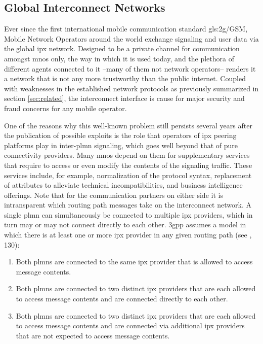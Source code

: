\subsection{Global Interconnect Networks}

Ever since the first international mobile communication standard \gls{gls:2g}/GSM, Mobile Network Operators around the world exchange signaling and user data via the global \gls{ipx} network.
Designed to be a private channel for communication amongst \glspl{mno} only, the way in which it is used today, and the plethora of different agents connected to it --many of them not network operators-- renders it a network that is not any more trustworthy than the public internet.
Coupled with weaknesses in the established network protocols as previously summarized in section \ref{sec:related}, the interconnect interface is cause for major security and fraud concerns for any mobile operator.

One of the reasons why this well-known problem still persists several years after the publication of possible exploits is the role that operators of \gls{ipx} peering platforms play in inter-\gls{plmn} signaling, which goes well beyond that of pure connectivity providers.
Many \glspl{mno} depend on them for supplementary services that require to access or even modify the contents of the signaling traffic.
These services include, for example, normalization of the protocol syntax, replacement of attributes to alleviate technical incompatibilities, and business intelligence offerings.
Note that for the communication partners on either side it is intransparent which routing path messages take on the interconnect network.
A single \gls{plmn} can simultaneously be connected to multiple \gls{ipx} providers, which in turn may or may not connect directly to each other.
\gls{3gpp} assumes a model in which there is at least one or more \gls{ipx} provider in any given routing path (see \cite{3gpp.33.501}, 130):

\begin{enumerate}[label=--]
    \item Both \glspl{plmn} are connected to the same \gls{ipx} provider that is allowed to access message contents.

    \item Both \glspl{plmn} are connected to two distinct \gls{ipx} providers that are each allowed to access message contents and are connected directly to each other.

    \item Both \glspl{plmn} are connected to two distinct \gls{ipx} providers that are each allowed to access message contents and are connected via additional \gls{ipx} providers that are not expected to access message contents.
\end{enumerate}

